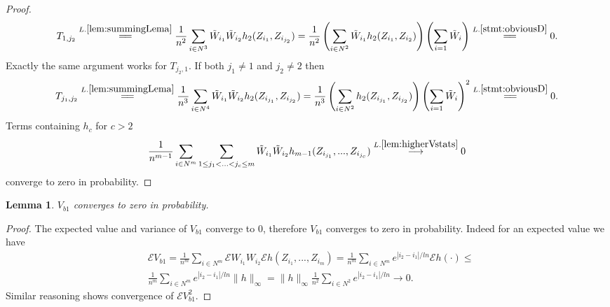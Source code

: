 \documentclass{article} %
\newtheorem{lemma}{Lemma}
\newcommand{\ev}{\mathcal{E}}
\begin{document}
\begin{proof}
\begin{align}
T_{1,j_2} \overset{L.\ref{lem:summingLema}}{=\joinrel=} \frac{1} {n^2}  \sum_{i \in N^3}  \tilde W_{i_1} \tilde W_{i_2} h_2(Z_{i_1},Z_{i_{j_2}}) = \frac{1} {n^2} \left( \sum_{i \in N^2}  \tilde W_{i_1}  h_2(Z_{i_1},Z_{i_2}) \right) \left( \sum_{i=1} \tilde W_i \right)  \overset{L.\ref{stmt:obviousD}}{=\joinrel=} 0.
\end{align}
Exactly the same argument works for $T_{j_2,1}$. If both $j_1 \neq 1$ and $j_2 \neq 2$ then 
\begin{align}
T_{j_1,j_2} \overset{L.\ref{lem:summingLema}}{=\joinrel=} \frac{1} {n^3}  \sum_{i \in N^4}  \tilde W_{i_1} \tilde W_{i_2} h_2(Z_{i_{j_1}},Z_{i_{j_2}}) = \frac{1} {n^3} \left( \sum_{i \in N^2}   h_2(Z_{i_{j_1}},Z_{i_{j_2}})\right) \left( \sum_{i=1} \tilde W_i \right)^2 \overset{L.\ref{stmt:obviousD}}{=\joinrel=}0.
\end{align}   
Terms containing $h_c$ for $c>2$ 
\begin{align}
\frac{1} {n^{m-1}}  \sum_{i \in N^m} \sum_{1 \leq j_1 < ...<j_{c} \leq m } \tilde W_{i_1} \tilde W_{i_2}  h_{m-1}(Z_{i_{j_1}},...,Z_{i_{j_{c}}}) \overset{L. \ref{lem:higherVstats}}{\longrightarrow} 0 
\end{align}
converge to zero in probability.
 \end{proof}
  
\begin{lemma}
\label{lem:degb2}
$ V_{b1}$ converges to zero in probability.  
\end{lemma}  
\begin{proof}
The expected value and variance of $V_{b1}$ converge to 0, therefore $V_{b1}$ converges to zero in probability. Indeed for an expected value we have
\begin{align}
& \ev V_{b1} = \frac {1} {n^m} \sum_{i \in N^m} \ev W_{i_1} W_{i_2} \ev h(Z_{i_1},...,Z_{i_m}) =  \frac {1} {n^m} \sum_{i \in N^m}  e^{|i_2-i_1|/ln} \ev h(\cdot) \leq   \\
&\frac {1} {n^m} \sum_{i \in N^m}  e^{|i_2-i_1|/ln} \parallel h \parallel_{\infty} =  \parallel h \parallel_{\infty} \frac {1} {n^2} \sum_{i \in N^2}  e^{|i_2-i_1|/ln}  \to 0.
\end{align}
Similar reasoning shows convergence of $\ev V_{b1}^2$.
\end{proof}  
  
\end{document}
